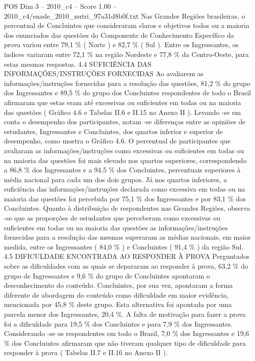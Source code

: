 \begin{textsample}{POS Dim 3 – 2010\_c4 – Score 1.00 – 2010\_c4/enade\_2010\_nutri\_97a31d8b0f.txt}
Nas Grandes Regiões brasileiras, o percentual de Concluintes que consideraram claros e objetivos todos ou a maioria dos enunciados das questões do Componente de Conhecimento Específico da prova variou entre 79,1 \% ( Norte ) e 82,7 \% ( Sul ).
Entre os Ingressantes, os índices variaram entre 72,1 \% na região Nordeste e 77,8 \% da Centro-Oeste, para estas mesmas respostas. 4.4 SUFICIÊNCIA DAS INFORMAÇÕES/INSTRUÇÕES FORNECIDAS Ao avaliarem as informações/instruções fornecidas para a resolução das questões, 81,2 \% do grupo dos Ingressantes e 89,5 \% do grupo dos Concluintes respondentes de todo o Brasil afirmaram que estas eram até excessivas ou suficientes em todas ou na maioria das questões ( Gráfico 4.6 e Tabelas II.6 e II.15 no Anexo II ).
Levando -se em conta o desempenho dos participantes, notam -se diferenças entre as opiniões de estudantes, Ingressantes e Concluintes, dos quartos inferior e superior de desempenho, como mostra o Gráfico 4.6.
O percentual de participantes que avaliaram as informações/instruções como excessivas ou suficientes em todas ou na maioria das questões foi mais elevado nos quartos superiores, correspondendo a 86,8 \% dos Ingressantes e a 94,5 \% dos Concluintes, percentuais superiores à média nacional para cada um dos dois grupos.
Já nos quartos inferiores, a suficiência das informações/instruções declarada como excessiva em todas ou na maioria das questões foi percebida por 75,1 \% dos Ingressantes e por 83,1 \% dos Concluintes.
Quanto à distribuição de respondentes nas Grandes Regiões, observa -se que as proporções de estudantes que perceberam como excessivas ou suficientes em todas ou na maioria das questões as informações/instruções fornecidas para a resolução das mesmas superaram as médias nacionais, em maior medida, entre os Ingressantes ( 84,0 \% ) e Concluintes ( 91,4 \% ) da região Sul. 4.5 DIFICULDADE ENCONTRADA AO RESPONDER À PROVA Perguntados sobre as dificuldades com as quais se depararam ao responder à prova, 63,2 \% do grupo de Ingressantes e 9,6 \% do grupo de Concluintes apontaram o desconhecimento do conteúdo.
Concluintes, por sua vez, apontaram a forma diferente de abordagem do conteúdo como dificuldade em maior evidência, mencionada por 45,8 \% deste grupo.
Esta alternativa foi apontada por uma parcela menor dos Ingressantes, 20,4 \%.
A falta de motivação para fazer a prova foi a dificuldade para 19,5 \% dos Concluintes e para 7,9 \% dos Ingressantes.
Considerando -se os respondentes em todo o Brasil, 7,0 \% dos Ingressantes e 19,6 \% dos Concluintes afirmaram que não tiveram qualquer tipo de dificuldade para responder à prova ( Tabelas II.7 e II.16 no Anexo II ).

\end{textsample}

